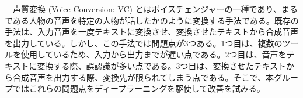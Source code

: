 \begin{jabstract}

　声質変換 (Voice Conversion: VC) とはボイスチェンジャーの一種であり、まるである人物の音声を特定の人物が話したかのように変換する手法である。既存の手法は、入力音声を一度テキストに変換させ、変換させたテキストから合成音声を出力している。しかし、この手法では問題点が3つある。1つ目は、複数のツールを使用しているため、入力から出力までが遅い点である。2つ目は、音声をテキストに変換する際、誤認識が多い点である。3つ目は、変換させたテキストから合成音声を出力する際、変換先が限られてしまう点である。そこで、本グループではこれらの問題点をディープラーニングを駆使して改善を試みる。




\end{jabstract}
